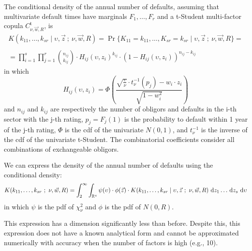 \documentclass[11pt,fleqn]{book} %
\begin{document}
\begin{proposition}
	\label{prop:cdand}
	The conditional density of the annual number of defaults, assuming 
	that multivariate default times have marginals $F_1,\dots,F_r$ and a 
	t-Student multi-factor copula $C_{\nu,\vec{w},R}^{\text{t}}$, is
	\begin{displaymath}
		\begin{array}{l}
			K(k_{11},\dots,k_{sr} \mid \upsilon,\vec{z}\ ;\ \nu,\vec{w}, R) = 
			\Pr\{K_{11}=k_{11},\dots,K_{sr}=k_{sr} \mid \upsilon,\vec{z}\ ;\ \nu, \vec{w}, R\} = \\
			\\
			= \displaystyle \prod_{i=1}^s \prod_{j=1}^r \binom{n_{ij}}{k_{ij}} \cdot
			H_{ij}(\upsilon,z_i)^{k_{ij}} \cdot
			\left( 1 - H_{ij}(\upsilon,z_i) \right)^{n_{ij}-k_{ij}}
		\end{array}
	\end{displaymath}
	in which
	\begin{displaymath}
		H_{ij}(\upsilon,z_i) = \Phi\left(  
		\frac{\sqrt{\frac{\upsilon}{\nu}} \cdot t_{\nu}^{-1}(p_j) - w_i\cdot z_i}{\sqrt{1-w_i^2}}
		\right)
	\end{displaymath}
	and $n_{ij}$ and $k_{ij}$ are respectively the number of obligors and 
	defaults in the i-th sector with the j-th rating, $p_j = F_j(1)$ 
	is the probability to default within 1 year of the j-th rating,
	$\Phi$ is the cdf of the univariate $N(0,1)$, and $t_{\nu}^{-1}$ is the 
	inverse of the cdf of the univariate t-Student. The combinatorial 
	coefficients consider all combinations of exchangeable obligors.
\end{proposition}

\begin{corollary}
	We can express the density of the annual number of defaults using 
	the conditional density:
	\begin{displaymath}
			K(k_{11},\dots,k_{sr}\ ;\ \nu, \vec{w}, R) = 
			\displaystyle \int_2^{\infty} \int_{\mathbb{R}^s}
			\psi(\upsilon) \cdot \phi(\vec{z}) \cdot
			K(k_{11},\dots,k_{sr} \mid \upsilon,\vec{z}\ ;\ \nu,\vec{w}, R) 
			\ud z_1 \dots \ud z_s \ud \upsilon
	\end{displaymath}
	in which $\psi$ is the pdf of $\chi_{\nu}^2$ and $\phi$ is the pdf 
	of $N(0,R)$.
\end{corollary}

This expression has a dimension significantly less than before. Despite 
this, this expression does not have a known analytical form and cannot 
be approximated numerically with accuracy when the number of factors is 
high (e.g., 10).
\end{document}
